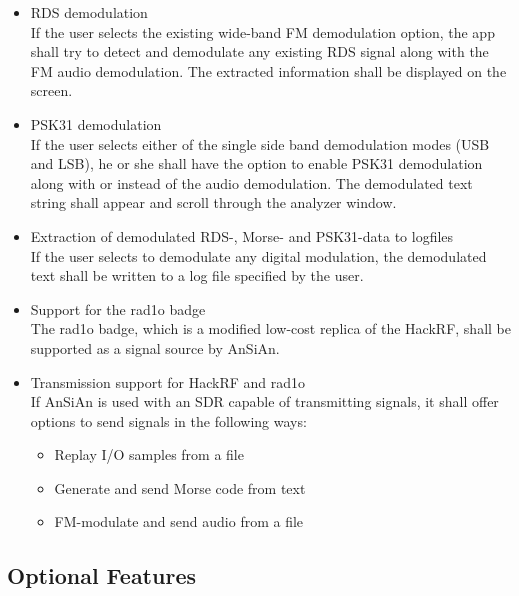 \begin{itemize}
	\item \ac{RDS} demodulation \\
		If the user selects the existing wide-band \ac{FM} demodulation option,
		the app shall try to detect and demodulate any existing \ac{RDS}
		signal along with the \ac{FM} audio demodulation. The extracted information
		shall be displayed on the screen.
	\item \ac{PSK31} demodulation \\
		If the user selects either of the single side band demodulation modes
		(\ac{USB} and \ac{LSB}), he or she shall have the option to enable
		\ac{PSK31} demodulation along with or instead of the audio demodulation.
		The demodulated text string shall appear and scroll through the
		analyzer window.
	\item Extraction of demodulated \ac{RDS}-, Morse- and \ac{PSK31}-data to logfiles \\
		If the user selects to demodulate any digital modulation, the demodulated
		text shall be written to a log file specified by the user.
	\item Support for the rad1o badge \\
		The rad1o badge, which is a modified low-cost replica of the HackRF,
		shall be supported as a signal source by \ac{AnSiAn}.
	\item Transmission support for HackRF and rad1o \\
		If \ac{AnSiAn} is used with an \ac{SDR} capable of transmitting signals,
		it shall offer options to send signals in the following ways:
		\begin{itemize}
			\item Replay I/O samples from a file
			\item Generate and send Morse code from text
			\item FM-modulate and send audio from a file
		\end{itemize}
\end{itemize}

\subsection{Optional Features}

